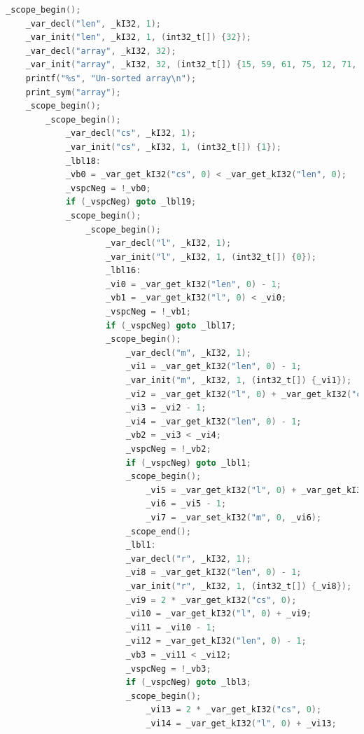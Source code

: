 \documentclass[a4paper]{article}
\begin{document}
\begin{lstlisting}[language=C]
_scope_begin();
    _var_decl("len", _kI32, 1);
    _var_init("len", _kI32, 1, (int32_t[]) {32});
    _var_decl("array", _kI32, 32);
    _var_init("array", _kI32, 32, (int32_t[]) {15, 59, 61, 75, 12, 71, 5, 35, 44, 6, 98, 17, 81, 56, 53, 31, 20, 11, 45, 80, 8, 34, 71, 83, 64, 28, 3, 88, 50, 48, 80, 5});
    printf("%s", "Un-sorted array\n");
    print_sym("array");
    _scope_begin();
        _scope_begin();
            _var_decl("cs", _kI32, 1);
            _var_init("cs", _kI32, 1, (int32_t[]) {1});
            _lbl18:
            _vb0 = _var_get_kI32("cs", 0) < _var_get_kI32("len", 0);
            _vspcNeg = !_vb0;
            if (_vspcNeg) goto _lbl19;
            _scope_begin();
                _scope_begin();
                    _var_decl("l", _kI32, 1);
                    _var_init("l", _kI32, 1, (int32_t[]) {0});
                    _lbl16:
                    _vi0 = _var_get_kI32("len", 0) - 1;
                    _vb1 = _var_get_kI32("l", 0) < _vi0;
                    _vspcNeg = !_vb1;
                    if (_vspcNeg) goto _lbl17;
                    _scope_begin();
                        _var_decl("m", _kI32, 1);
                        _vi1 = _var_get_kI32("len", 0) - 1;
                        _var_init("m", _kI32, 1, (int32_t[]) {_vi1});
                        _vi2 = _var_get_kI32("l", 0) + _var_get_kI32("cs", 0);
                        _vi3 = _vi2 - 1;
                        _vi4 = _var_get_kI32("len", 0) - 1;
                        _vb2 = _vi3 < _vi4;
                        _vspcNeg = !_vb2;
                        if (_vspcNeg) goto _lbl1;
                        _scope_begin();
                            _vi5 = _var_get_kI32("l", 0) + _var_get_kI32("cs", 0);
                            _vi6 = _vi5 - 1;
                            _vi7 = _var_set_kI32("m", 0, _vi6);
                        _scope_end();
                        _lbl1:
                        _var_decl("r", _kI32, 1);
                        _vi8 = _var_get_kI32("len", 0) - 1;
                        _var_init("r", _kI32, 1, (int32_t[]) {_vi8});
                        _vi9 = 2 * _var_get_kI32("cs", 0);
                        _vi10 = _var_get_kI32("l", 0) + _vi9;
                        _vi11 = _vi10 - 1;
                        _vi12 = _var_get_kI32("len", 0) - 1;
                        _vb3 = _vi11 < _vi12;
                        _vspcNeg = !_vb3;
                        if (_vspcNeg) goto _lbl3;
                        _scope_begin();
                            _vi13 = 2 * _var_get_kI32("cs", 0);
                            _vi14 = _var_get_kI32("l", 0) + _vi13;

\end{lstlisting}
\end{document}
